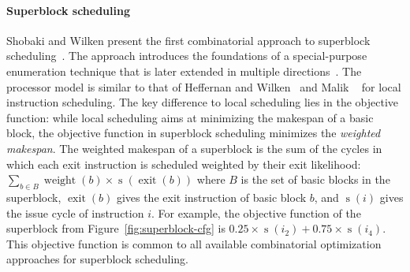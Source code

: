 \documentclass[acmsmall,authorversion,nonacm]{acmart}
\newcommand{\noMathVar}[2]{\operatorname{#1}(#2)}
\newcommand{\var}[2]{$\noMathVar{#1}{#2}$}
\newcommand{\textSummation}[2]{\textstyle\sum_{#1}#2}
\newcommand{\exitWeightSymbol}{\operatorname{weight}}
\newcommand{\exitWeight}[1]{\exitWeightSymbol(#1)}
\newcommand{\exitInstructionSymbol}{\operatorname{exit}}
\newcommand{\exitInstruction}[1]{\exitInstructionSymbol(#1)}
\begin{document}
\paragraph{Superblock scheduling}

Shobaki and Wilken present the first combinatorial approach to
superblock scheduling~\cite{Shobaki2004}.
The approach introduces the foundations of a special-purpose
enumeration technique that is later extended in multiple
directions~\cite{Shobaki2009,Shobaki2013}.
The processor model is similar to that of Heffernan and
Wilken~\cite{Heffernan2006} and Malik \etal{}~\cite{Malik2008} for
local instruction scheduling.
The key difference to local scheduling lies in the objective function:
while local scheduling aims at minimizing the makespan of a basic
block, the objective function in superblock scheduling minimizes the
\emph{weighted makespan}.
The weighted makespan of a superblock is the sum of the cycles in
which each exit instruction is scheduled weighted by their exit
likelihood:
$\textSummation{b \in B}{\exitWeight{b} \times \noMathVar{s}{\exitInstruction{b}}}$
where $B$ is the set of basic blocks in the superblock,
$\exitInstruction{b}$ gives the exit instruction of basic block $b$,
and \var{s}{i} gives the issue cycle of instruction $i$.
For example, the objective function of the superblock from
Figure~\ref{fig:superblock-cfg} is $0.25 \times \noMathVar{s}{i_2} +
0.75 \times \noMathVar{s}{i_4}$.
This objective function is common to all available combinatorial
optimization approaches for superblock scheduling.
\end{document}
